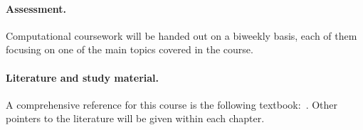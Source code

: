 \documentclass[a4paper,11pt]{article}
\begin{document}
\paragraph{Assessment.}%
\label{par:assessment}
Computational coursework will be handed out on a biweekly basis,
each of them focusing on one of the main topics covered in the course.

\paragraph{Literature and study material.}%
A comprehensive reference for this course is the following textbook:~.
Other pointers to the literature will be given within each chapter.
\end{document}
